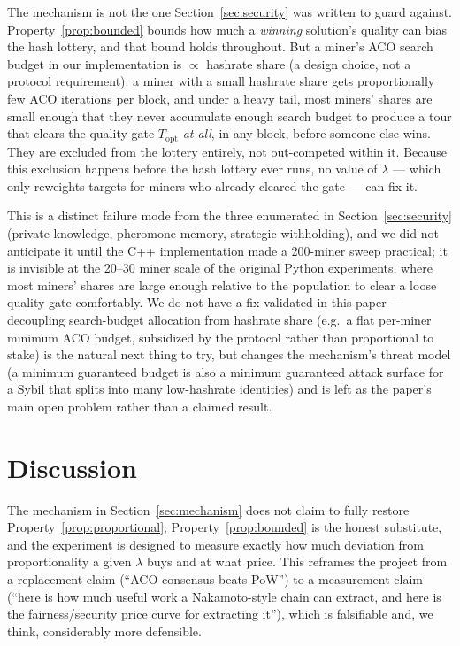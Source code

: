 \documentclass[journal]{IEEEtran}
\begin{document}
The mechanism is not the one Section~\ref{sec:security} was written to
guard against. Property~\ref{prop:bounded} bounds how much a
\emph{winning} solution's quality can bias the hash lottery, and that bound
holds throughout. But a miner's ACO search budget in our implementation is
$\propto$ hashrate share (a design choice, not a protocol requirement): a
miner with a small hashrate share gets proportionally few ACO iterations
per block, and under a heavy tail, most miners' shares are small enough
that they never accumulate enough search budget to produce a tour that
clears the quality gate $T_{\text{opt}}$ \emph{at all}, in any block, before
someone else wins. They are excluded from the lottery entirely, not
out-competed within it. Because this exclusion happens before the hash
lottery ever runs, no value of $\lambda$ --- which only reweights targets
for miners who already cleared the gate --- can fix it.

This is a distinct failure mode from the three enumerated in
Section~\ref{sec:security} (private knowledge, pheromone memory, strategic
withholding), and we did not anticipate it until the C++ implementation
made a 200-miner sweep practical; it is invisible at the 20--30 miner scale
of the original Python experiments, where most miners' shares are large
enough relative to the population to clear a loose quality gate
comfortably. We do not have a fix validated in this paper --- decoupling
search-budget allocation from hashrate share (e.g.\ a flat per-miner
minimum ACO budget, subsidized by the protocol rather than proportional to
stake) is the natural next thing to try, but changes the mechanism's
threat model (a minimum guaranteed budget is also a minimum guaranteed
attack surface for a Sybil that splits into many low-hashrate identities)
and is left as the paper's main open problem rather than a claimed result.

\section{Discussion}

The mechanism in Section~\ref{sec:mechanism} does not claim to fully restore
Property~\ref{prop:proportional}; Property~\ref{prop:bounded} is the honest
substitute, and the experiment is designed to measure exactly how much
deviation from proportionality a given $\lambda$ buys and at what price. This
reframes the project from a replacement claim (``ACO consensus beats PoW'')
to a measurement claim (``here is how much useful work a Nakamoto-style chain
can extract, and here is the fairness/security price curve for extracting
it''), which is falsifiable and, we think, considerably more defensible.
\end{document}
